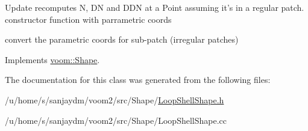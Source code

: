 Update recomputes N, DN and DDN at a Point assuming it's in a regular patch. constructor function with parrametric coords 

convert the parametric coords for sub-\/patch (irregular patches) 

Implements \hyperlink{classvoom_1_1_shape_a8ded544de12647543b056cec61be9f26}{voom::Shape}.

The documentation for this class was generated from the following files:\begin{DoxyCompactItemize}
\item 
/u/home/s/sanjaydm/voom2/src/Shape/\hyperlink{_loop_shell_shape_8h}{LoopShellShape.h}\item 
/u/home/s/sanjaydm/voom2/src/Shape/LoopShellShape.cc\end{DoxyCompactItemize}
